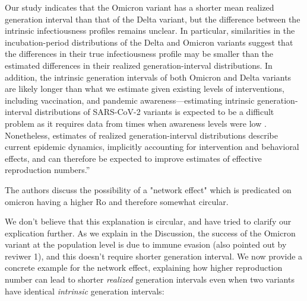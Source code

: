 \documentclass[12pt]{article}
\newcommand{\revtext}{\textsf}
\begin{document}
Our study indicates that the Omicron variant has a shorter mean realized generation interval than that of the Delta variant, but the difference between the intrinsic infectiousness profiles remains unclear.
In particular, similarities in the incubation-period distributions of the Delta and Omicron variants suggest that the differences in their true infectiousness profile may be smaller than the estimated differences in their realized generation-interval distributions.
In addition, the intrinsic generation intervals of both Omicron and Delta variants are likely longer than what we estimate given existing levels of interventions, including vaccination, and pandemic awareness---estimating intrinsic generation-interval distributions of SARS-CoV-2 variants is expected to be a difficult problem as it requires data from times when awareness levels were low \citep{sender2021unmitigated}.
Nonetheless, estimates of realized generation-interval distributions describe current epidemic dynamics, implicitly accounting for intervention and behavioral effects,
and can therefore be expected to improve estimates of effective reproduction numbers.''

\revtext{The authors discuss the possibility of a "network effect" which is predicated on omicron having a higher Ro and therefore somewhat circular.}

We don't believe that this explanation is circular, and have tried to clarify our explication further. As we explain in the Discussion, the success of the Omicron variant at the population level is due to immune evasion (also pointed out by reviwer 1), and this doesn't require shorter generation interval. We now provide a concrete example for the network effect, explaining how higher reproduction number can lead to shorter \emph{realized} generation intervals even when two variants have identical \emph{intrinsic} generation intervals:
\end{document}
